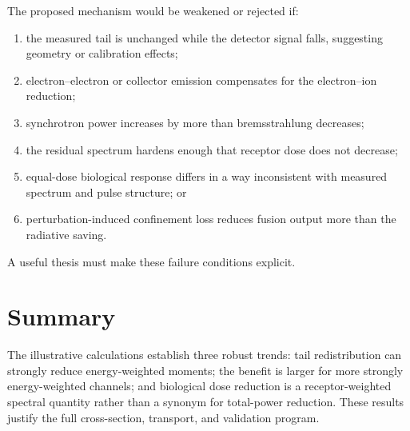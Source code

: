 The proposed mechanism would be weakened or rejected if:
\begin{enumerate}
\item the measured tail is unchanged while the detector signal falls, suggesting geometry or calibration effects;
\item electron--electron or collector emission compensates for the electron--ion reduction;
\item synchrotron power increases by more than bremsstrahlung decreases;
\item the residual spectrum hardens enough that receptor dose does not decrease;
\item equal-dose biological response differs in a way inconsistent with measured spectrum and pulse structure; or
\item perturbation-induced confinement loss reduces fusion output more than the radiative saving.
\end{enumerate}
A useful thesis must make these failure conditions explicit.

\section{Summary}

The illustrative calculations establish three robust trends: tail redistribution can strongly reduce energy-weighted moments; the benefit is larger for more strongly energy-weighted channels; and biological dose reduction is a receptor-weighted spectral quantity rather than a synonym for total-power reduction. These results justify the full cross-section, transport, and validation program.
